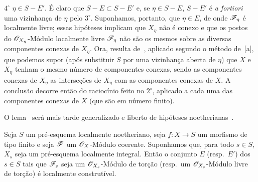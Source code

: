 $4^\circ$ $\eta\in S-E'$.
É claro que $S-E\subset S-E'$ e, se $\eta\in S-E$, $S-E'$ é \emph{a fortiori} uma vizinhança de $\eta$ pelo $3^\circ$.
Suponhamos, portanto, que $\eta\in E$, de onde $\mathscr{F}_\eta$ é localmente livre; essas hipóteses implicam que $X_\eta$ não é conexo e que os postos do $\mathscr{O}_{X_\eta}$-Módulo localmente livre $\mathscr{F}_\eta$ não são os mesmos sobre as diversas componentes conexas de $X_\eta$.
Ora, resulta de~, aplicado segundo o método de~[a], que podemos supor (após substituir $S$ por uma vizinhança aberta de $\eta$) que $X$ e $X_\eta$ tenham o mesmo número de componentes conexas, sendo as componentes conexas de $X_\eta$ as interseções de $X_\eta$ com as componentes conexas de $X$.
A conclusão decorre então do raciocínio feito no $2^\circ$, aplicado a cada uma das componentes conexas de $X$ (que são em número finito).

\begin{remark}[9.4.7.2]
\label{IV.9.4.7.2}
O lema~ será mais tarde generalizado e liberto de hipóteses noetherianas~.
\end{remark}

\begin{proposition}[9.4.8]
\label{IV.9.4.8}
Seja $S$ um pré-esquema localmente noetheriano, seja $f:X\to S$ um morfismo de tipo finito e seja $\mathscr{F}$ um $\mathscr{O}_X$-Módulo coerente.
Suponhamos que, para todo $s\in S$, $X_s$ seja um pré-esquema localmente integral.
Então o conjunto $E$ \textnormal{(}resp.\ $E'$\textnormal{)} dos $s\in S$ tais que $\mathscr{F}_s$ seja um $\mathscr{O}_{X_s}$-Módulo de torção \textnormal{(}resp.\ um $\mathscr{O}_{X_s}$-Módulo livre de torção\textnormal{)} é localmente construtível.
\end{proposition}

